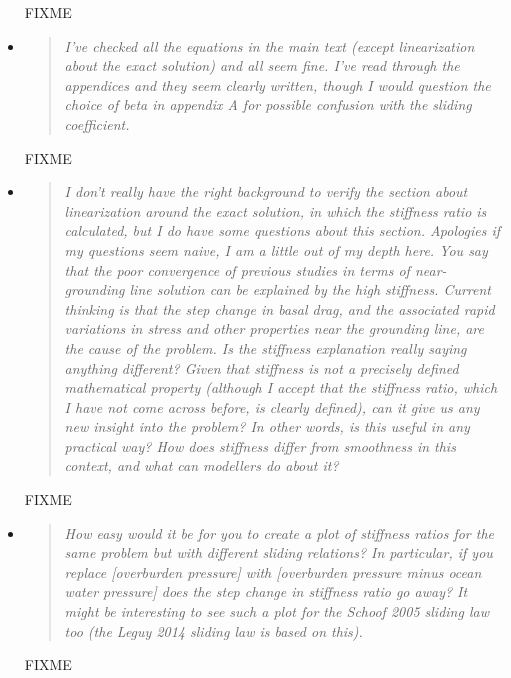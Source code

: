 \documentclass[11pt,reqno]{amsart}
\begin{document}
\begin{itemize}
\noindent FIXME


\item  \begin{quote}
\emph{I've checked all the equations in the main text (except linearization about the exact solution) and all seem fine. I've read through the appendices and they seem clearly written, though I would question the choice of beta in appendix A for possible confusion with the sliding coefficient.}
\end{quote}

\noindent FIXME


\item  \begin{quote}
\emph{I don't really have the right background to verify the section about linearization around the exact solution, in which the stiffness ratio is calculated, but I do have some questions about this section. Apologies if my questions seem naive, I am a little out of my depth here. You say that the poor convergence of previous studies in terms of near-grounding line solution can be explained by the high stiffness. Current thinking is that the step change in basal drag, and the associated rapid variations in stress and other properties near the grounding line, are the cause of the problem. Is the stiffness explanation really saying anything different? Given that stiffness is not a precisely defined mathematical property (although I accept that the stiffness ratio, which I have not come across before, is clearly defined), can it give us any new insight into the problem? In other words, is this useful in any practical way? How does stiffness differ from smoothness in this context, and what can modellers do about it?}
\end{quote}

\noindent FIXME


\item  \begin{quote}
\emph{How easy would it be for you to create a plot of stiffness ratios for the same problem but with different sliding relations? In particular, if you replace [overburden pressure] with [overburden pressure minus ocean water pressure] does the step change in stiffness ratio go away? It might be interesting to see such a plot for the Schoof 2005 sliding law too (the Leguy 2014 sliding law is based on this).}
\end{quote}

\noindent FIXME



\end{itemize}
\end{document}
